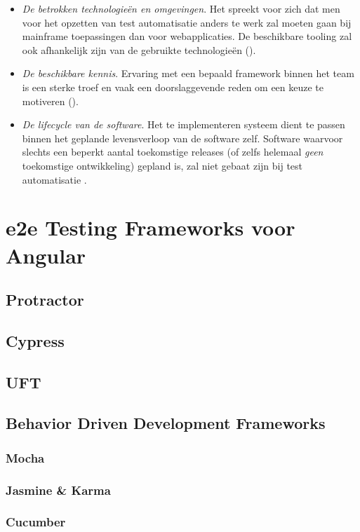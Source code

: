 \begin{itemize}
    \item \emph{De betrokken technologieën en omgevingen}. Het spreekt voor zich dat men voor het opzetten van test automatisatie anders te werk zal moeten gaan bij mainframe toepassingen dan voor webapplicaties. De beschikbare tooling zal ook afhankelijk zijn van de gebruikte technologieën (\cite{10.1145/1295014.1295062}).
    \item \emph{De beschikbare kennis}. Ervaring met een bepaald framework binnen het team is een sterke troef en vaak een doorslaggevende reden om een keuze te motiveren (\cite{Madan2013}).
    \item \emph{De lifecycle van de software}. Het te implementeren systeem dient te passen binnen het geplande levensverloop van de software zelf. Software waarvoor slechts een beperkt aantal toekomstige releases (of zelfs helemaal \emph{geen} toekomstige ontwikkeling) gepland is, zal niet gebaat zijn bij test automatisatie \autocite{Tiitinen2013}.
\end{itemize}

\section{e2e Testing Frameworks voor Angular}

\autocite{Anandan}
\autocite{Kumar2016}
\autocite{Barrett2013}
\autocite{Holmes}
\autocite{Singh2015}
\autocite{Madan2013}

\lipsum[4]

\subsection{Protractor}

\lipsum[6-7]

\subsection{Cypress}

\lipsum[3-4]

\subsection{UFT}

\lipsum[3-4]

\subsection{Behavior Driven Development Frameworks}

\lipsum[9]

\subsubsection{Mocha}

\lipsum[8-10]

\subsubsection{Jasmine \& Karma}

\lipsum[8-10]

\subsubsection{Cucumber}

\lipsum[8-10]